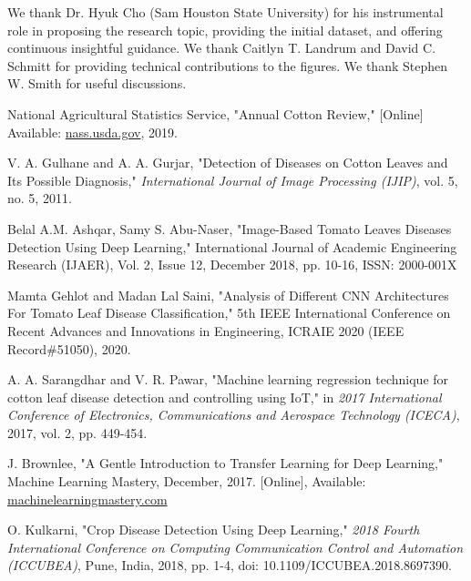 \documentclass[conference]{IEEEtran}
\begin{document}
We thank Dr. Hyuk Cho (Sam Houston State University) for his instrumental role in proposing the research topic, providing the initial dataset, and offering continuous insightful guidance. We thank Caitlyn T. Landrum and David C. Schmitt for providing technical contributions to the figures. We thank Stephen W. Smith for useful discussions.


%

    
\begin{thebibliography}{00}

 National Agricultural Statistics Service, "Annual Cotton Review," [Online] Available: \href{https://www.nass.usda.gov/Statistics_by_State/Texas/Publications/Current_News_Release/2020_Rls/tx-cotton-review-2020.pdf}{nass.usda.gov}, 2019.

 V. A. Gulhane and A. A. Gurjar, "Detection of Diseases on Cotton Leaves and Its Possible Diagnosis," \textit{International Journal of Image Processing (IJIP)}, vol. 5, no. 5, 2011.

 Belal A.M. Ashqar, Samy S. Abu-Naser, "Image-Based Tomato Leaves Diseases Detection Using Deep Learning," International Journal of Academic Engineering Research (IJAER), Vol. 2, Issue 12, December 2018, pp. 10-16, ISSN: 2000-001X

 Mamta Gehlot and Madan Lal Saini, "Analysis of Different CNN Architectures For Tomato Leaf Disease Classification," 5th IEEE International Conference on Recent Advances and Innovations in Engineering, ICRAIE 2020 (IEEE Record\#51050), 2020. 

 A. A. Sarangdhar and V. R. Pawar, "Machine learning regression technique for cotton leaf disease detection and controlling using IoT," in \textit{2017 International Conference of Electronics, Communications and Aerospace Technology (ICECA)}, 2017, vol. 2, pp. 449-454.

 J. Brownlee, "A Gentle Introduction to Transfer Learning for Deep Learning," Machine Learning Mastery, December, 2017. [Online], Available: \href{https://machinelearningmastery.com/transfer-learning-for-deep-learning/#:~:text=Transfer\%20learning\%20is\%20a\%20machine,model\%20on\%20a\%20second\%20task.&text=Common\%20examples\%20of\%20transfer\%20learning,your\%20own\%20predictive\%20modeling\%20problems.}{machinelearningmastery.com}

 O. Kulkarni, "Crop Disease Detection Using Deep Learning," \textit{2018 Fourth International Conference on Computing Communication Control and Automation (ICCUBEA)}, Pune, India, 2018, pp. 1-4, doi: 10.1109/ICCUBEA.2018.8697390.


\end{thebibliography}
\end{document}
